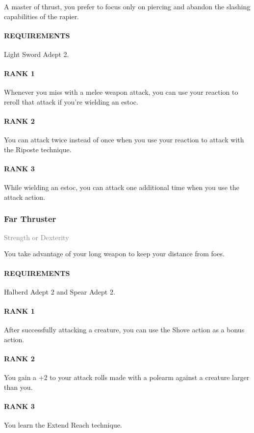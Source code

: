 \normalsize
A master of thrust, you prefer to focus only on piercing and abandon the slashing capabilities of the rapier.
\paragraph{REQUIREMENTS} Light Sword Adept 2.
\paragraph{RANK 1} Whenever you miss with a melee weapon attack, you can use your reaction to reroll that attack if you're wielding an estoc.
\paragraph{RANK 2} You can attack twice instead of once when you use your reaction to attack with the Riposte technique.
\paragraph{RANK 3} While wielding an estoc, you can attack one additional time when you use the attack action.

\subsubsection{Far Thruster} \label{feat::farthruster}
\small{\textcolor{gray}{Strength or Dexterity}}

\normalsize
You take advantage of your long weapon to keep your distance from foes.
\paragraph{REQUIREMENTS} Halberd Adept 2 and Spear Adept 2.
\paragraph{RANK 1} After successfully attacking a creature, you can use the Shove action as a bonus action.
\paragraph{RANK 2} You gain a +2 to your attack rolls made with a polearm against a creature larger than you.
\paragraph{RANK 3} You learn the Extend Reach technique.

